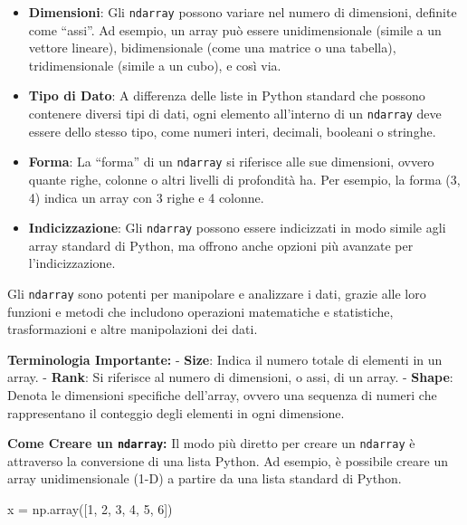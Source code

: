\documentclass[
  letterpaper,
  krantz2]{{[}./krantz{]}}
\newenvironment{Shaded}{\begin{snugshade}}{\end{snugshade}}
\newcommand{\DecValTok}[1]{\textcolor[rgb]{0.68,0.00,0.00}{#1}}
\newcommand{\NormalTok}[1]{\textcolor[rgb]{0.00,0.23,0.31}{#1}}
\newcommand{\OperatorTok}[1]{\textcolor[rgb]{0.37,0.37,0.37}{#1}}
\providecommand{\tightlist}{%
  \setlength{\itemsep}{0pt}\setlength{\parskip}{0pt}}\usepackage{longtable,booktabs,array}
\begin{document}
\begin{itemize}
\tightlist
\item
  \textbf{Dimensioni}: Gli \texttt{ndarray} possono variare nel numero
  di dimensioni, definite come ``assi''. Ad esempio, un array può essere
  unidimensionale (simile a un vettore lineare), bidimensionale (come
  una matrice o una tabella), tridimensionale (simile a un cubo), e così
  via.
\item
  \textbf{Tipo di Dato}: A differenza delle liste in Python standard che
  possono contenere diversi tipi di dati, ogni elemento all'interno di
  un \texttt{ndarray} deve essere dello stesso tipo, come numeri interi,
  decimali, booleani o stringhe.
\item
  \textbf{Forma}: La ``forma'' di un \texttt{ndarray} si riferisce alle
  sue dimensioni, ovvero quante righe, colonne o altri livelli di
  profondità ha. Per esempio, la forma (3, 4) indica un array con 3
  righe e 4 colonne.
\item
  \textbf{Indicizzazione}: Gli \texttt{ndarray} possono essere
  indicizzati in modo simile agli array standard di Python, ma offrono
  anche opzioni più avanzate per l'indicizzazione.
\end{itemize}

Gli \texttt{ndarray} sono potenti per manipolare e analizzare i dati,
grazie alle loro funzioni e metodi che includono operazioni matematiche
e statistiche, trasformazioni e altre manipolazioni dei dati.

\textbf{Terminologia Importante:} - \textbf{Size}: Indica il numero
totale di elementi in un array. - \textbf{Rank}: Si riferisce al numero
di dimensioni, o assi, di un array. - \textbf{Shape}: Denota le
dimensioni specifiche dell'array, ovvero una sequenza di numeri che
rappresentano il conteggio degli elementi in ogni dimensione.

\textbf{Come Creare un \texttt{ndarray}:} Il modo più diretto per creare
un \texttt{ndarray} è attraverso la conversione di una lista Python. Ad
esempio, è possibile creare un array unidimensionale (1-D) a partire da
una lista standard di Python.

\begin{Shaded}
\begin{Highlighting}[]
\NormalTok{x }\OperatorTok{=}\NormalTok{ np.array([}\DecValTok{1}\NormalTok{, }\DecValTok{2}\NormalTok{, }\DecValTok{3}\NormalTok{, }\DecValTok{4}\NormalTok{, }\DecValTok{5}\NormalTok{, }\DecValTok{6}\NormalTok{])}
\end{Highlighting}
\end{Shaded}
\end{document}
